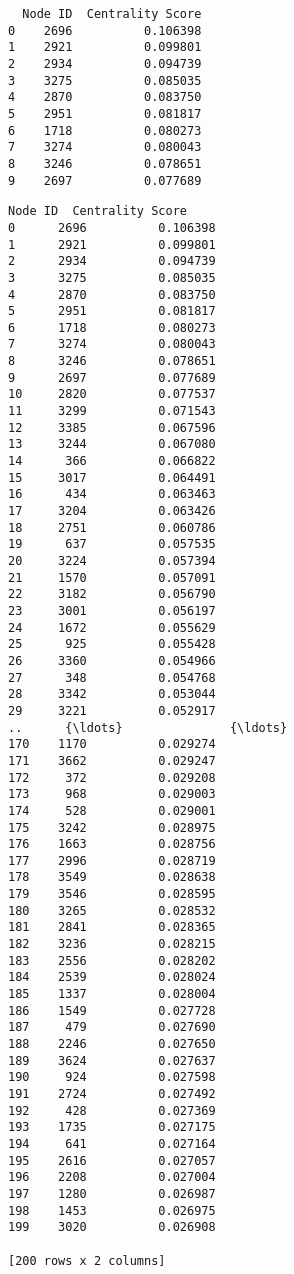 \documentclass[11pt]{article}
\begin{document}
    
    \begin{verbatim}
  Node ID  Centrality Score
0    2696          0.106398
1    2921          0.099801
2    2934          0.094739
3    3275          0.085035
4    2870          0.083750
5    2951          0.081817
6    1718          0.080273
7    3274          0.080043
8    3246          0.078651
9    2697          0.077689
    \end{verbatim}

    
    \begin{Verbatim}[commandchars=\\\{\}]
    Node ID  Centrality Score
0      2696          0.106398
1      2921          0.099801
2      2934          0.094739
3      3275          0.085035
4      2870          0.083750
5      2951          0.081817
6      1718          0.080273
7      3274          0.080043
8      3246          0.078651
9      2697          0.077689
10     2820          0.077537
11     3299          0.071543
12     3385          0.067596
13     3244          0.067080
14      366          0.066822
15     3017          0.064491
16      434          0.063463
17     3204          0.063426
18     2751          0.060786
19      637          0.057535
20     3224          0.057394
21     1570          0.057091
22     3182          0.056790
23     3001          0.056197
24     1672          0.055629
25      925          0.055428
26     3360          0.054966
27      348          0.054768
28     3342          0.053044
29     3221          0.052917
..      {\ldots}               {\ldots}
170    1170          0.029274
171    3662          0.029247
172     372          0.029208
173     968          0.029003
174     528          0.029001
175    3242          0.028975
176    1663          0.028756
177    2996          0.028719
178    3549          0.028638
179    3546          0.028595
180    3265          0.028532
181    2841          0.028365
182    3236          0.028215
183    2556          0.028202
184    2539          0.028024
185    1337          0.028004
186    1549          0.027728
187     479          0.027690
188    2246          0.027650
189    3624          0.027637
190     924          0.027598
191    2724          0.027492
192     428          0.027369
193    1735          0.027175
194     641          0.027164
195    2616          0.027057
196    2208          0.027004
197    1280          0.026987
198    1453          0.026975
199    3020          0.026908

[200 rows x 2 columns]

    \end{Verbatim}
\end{document}
